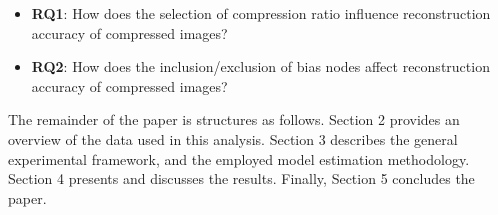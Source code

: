 \begin{itemize}
	\item[] \textbf{RQ1}: How does the selection of compression ratio influence reconstruction accuracy of compressed images?
	\item[] \textbf{RQ2}: How does the inclusion/exclusion of bias nodes affect reconstruction accuracy of compressed images?
\end{itemize}

\noindent
The remainder of the paper is structures as follows. Section 2 provides an overview of the data used in this analysis. Section 3 describes the general experimental framework, and the employed model estimation methodology. Section 4 presents and discusses the results. Finally, Section 5 concludes the paper.



